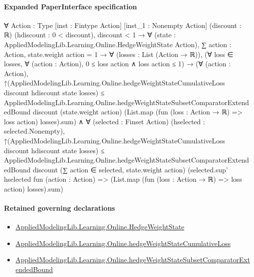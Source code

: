 \documentclass[10pt]{article}
\begin{document}
\paragraph{Expanded PaperInterface specification}
\begin{ReviewVerbatim}
∀ {Action : Type} [inst : Fintype Action] [inst_1 : Nonempty Action] (discount : ℝ) (hdiscount : 0 < discount),
  discount < 1 →
    ∀ (state : AppliedModelingLib.Learning.Online.HedgeWeightState Action),
      ∑ action : Action, state.weight action = 1 →
        ∀ (losses : List (Action → ℝ)),
          (∀ loss ∈ losses, ∀ (action : Action), 0 ≤ loss action ∧ loss action ≤ 1) →
            (∀ (action : Action),
                ↑(AppliedModelingLib.Learning.Online.hedgeWeightStateCumulativeLoss discount hdiscount state losses) ≤
                  AppliedModelingLib.Learning.Online.hedgeWeightStateSubsetComparatorExtendedBound discount
                    (state.weight action) (List.map (fun (loss : Action → ℝ) => loss action) losses).sum) ∧
              ∀ (selected : Finset Action) (hselected : selected.Nonempty),
                ↑(AppliedModelingLib.Learning.Online.hedgeWeightStateCumulativeLoss discount hdiscount state losses) ≤
                  AppliedModelingLib.Learning.Online.hedgeWeightStateSubsetComparatorExtendedBound discount
                    (∑ action ∈ selected, state.weight action)
                    (selected.sup' hselected fun (action : Action) =>
                      (List.map (fun (loss : Action → ℝ) => loss action) losses).sum)
\end{ReviewVerbatim}

\paragraph{Retained governing declarations}
\begin{itemize}\raggedright
\item \hyperlink{library-prerequisite-8196082d02788389}{Applied\allowbreak{}Modeling\allowbreak{}Lib.\allowbreak{}Learning.\allowbreak{}Online.\allowbreak{}Hedge\allowbreak{}Weight\allowbreak{}State}
\item \hyperlink{library-prerequisite-d910405064240e75}{Applied\allowbreak{}Modeling\allowbreak{}Lib.\allowbreak{}Learning.\allowbreak{}Online.\allowbreak{}hedge\allowbreak{}Weight\allowbreak{}State\allowbreak{}Cumulative\allowbreak{}Loss}
\item \hyperlink{governing-declaration-75a03126325c982d}{Applied\allowbreak{}Modeling\allowbreak{}Lib.\allowbreak{}Learning.\allowbreak{}Online.\allowbreak{}hedge\allowbreak{}Weight\allowbreak{}State\allowbreak{}Subset\allowbreak{}Comparator\allowbreak{}Extended\allowbreak{}Bound}
\end{itemize}
\end{document}
